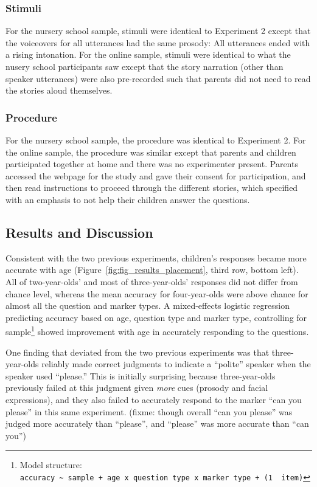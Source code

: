 \documentclass[10pt, letterpaper]{article}
\begin{document}
\subsubsection{Stimuli}\label{stimuli}

For the nursery school sample, stimuli were identical to Experiment 2
except that the voiceovers for all utterances had the same prosody: All
utterances ended with a rising intonation. For the online sample,
stimuli were identical to what the nusery school participants saw except
that the story narration (other than speaker utterances) were also
pre-recorded such that parents did not need to read the stories aloud
themselves.

\subsubsection{Procedure}\label{procedure-2}

For the nursery school sample, the procedure was identical to Experiment
2. For the online sample, the procedure was similar except that parents
and children participated together at home and there was no experimenter
present. Parents accessed the webpage for the study and gave their
consent for participation, and then read instructions to proceed through
the different stories, which specified with an emphasis to not help
their children answer the questions.

\subsection{Results and Discussion}\label{results-and-discussion-2}

Consistent with the two previous experiments, children's responses
became more accurate with age (Figure~\ref{fig:fig_results_placement},
third row, bottom left). All of two-year-olds' and most of
three-year-olds' responses did not differ from chance level, whereas the
mean accuracy for four-year-olds were above chance for almost all the
question and marker types. A mixed-effects logistic regression
predicting accuracy based on age, question type and marker type,
controlling for sample\footnote{Model structure:
  \texttt{accuracy\ \textasciitilde{}\ sample\ +\ age\ x\ question\ type\ x\ marker\ type\ +\ (1\ \textbar{}\ item)}}
showed improvement with age in accurately responding to the questions.

One finding that deviated from the two previous experiments was that
three-year-olds reliably made correct judgments to indicate a ``polite''
speaker when the speaker used ``please.'' This is initially surprising
because three-year-olds previously failed at this judgment given
\emph{more} cues (prosody and facial expressions), and they also failed
to accurately respond to the marker ``can you please'' in this same
experiment. (fixme: though overall ``can you please'' was judged more
accurately than ``please'', and ``please'' was more accurate than ``can
you'')
\end{document}
